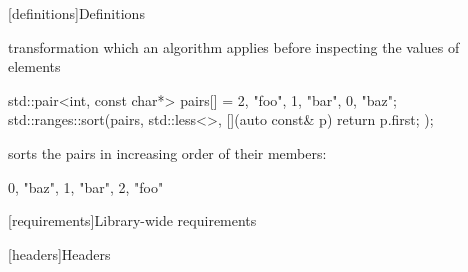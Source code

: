 \setcounter{section}{2}
[definitions]{Definitions}


{\color{addclr}
\setcounter{subsection}{17}
%
 transformation which an algorithm applies
before inspecting the values of elements

\enterexample
\begin{codeblock}
std::pair<int, const char*> pairs[] = {{2, "foo"}, {1, "bar"}, {0, "baz"}};
std::ranges::sort(pairs, std::less<>{}, [](auto const& p) { return p.first; });
\end{codeblock}
sorts the pairs in increasing order of their  members:
\begin{codeblock}
{{0, "baz"}, {1, "bar"}, {2, "foo"}}
\end{codeblock}
\exitexample
} %

\setcounter{section}{4}
[requirements]{Library-wide requirements}

\setcounter{subsection}{1}
\setcounter{subsubsection}{1}
[headers]{Headers}


